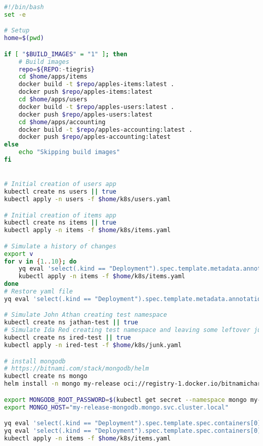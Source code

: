 \begin{lstlisting}[caption={TODO},language=bash,label=appendix:todo]
#!/bin/bash
set -e

# Setup
home=$(pwd)

if [ "$BUILD_IMAGES" = "1" ]; then
    # Build images
    repo=${REPO:-tiegris}
    cd $home/apps/items
    docker build -t $repo/apples-items:latest .
    docker push $repo/apples-items:latest
    cd $home/apps/users
    docker build -t $repo/apples-users:latest .
    docker push $repo/apples-users:latest
    cd $home/apps/accounting
    docker build -t $repo/apples-accounting:latest .
    docker push $repo/apples-accounting:latest
else
    echo "Skipping build images"
fi


# Initial creation of users app
kubectl create ns users || true
kubectl apply -n users -f $home/k8s/users.yaml

# Initial creation of items app
kubectl create ns items || true
kubectl apply -n items -f $home/k8s/items.yaml

# Simulate a history of changes
export v
for v in {1..10}; do
    yq eval 'select(.kind == "Deployment").spec.template.metadata.annotations.v = env(v)' $home/k8s/items.yaml -i
    kubectl apply -n items -f $home/k8s/items.yaml
done
# Restore yaml file
yq eval 'select(.kind == "Deployment").spec.template.metadata.annotations.v = "0"' $home/k8s/items.yaml -i

# Simulate John Athan creating test namespace
kubectl create ns jathan-test || true
# Simulate Ida Red creating test namespace and leaving some leftover junk in it
kubectl create ns ired-test || true
kubectl apply -n ired-test -f $home/k8s/junk.yaml

# install mongodb
# https://bitnami.com/stack/mongodb/helm
kubectl create ns mongo
helm install -n mongo my-release oci://registry-1.docker.io/bitnamicharts/mongodb

export MONGODB_ROOT_PASSWORD=$(kubectl get secret --namespace mongo my-release-mongodb -o jsonpath="{.data.mongodb-root-password}" | base64 -d)
export MONGO_HOST="my-release-mongodb.mongo.svc.cluster.local"

yq eval 'select(.kind == "Deployment").spec.template.spec.containers[0].env[0].value = env(MONGODB_ROOT_PASSWORD)' $home/k8s/items.yaml -i
yq eval 'select(.kind == "Deployment").spec.template.spec.containers[0].env[1].value = env(MONGO_HOST)' $home/k8s/items.yaml -i
kubectl apply -n items -f $home/k8s/items.yaml
\end{lstlisting}

